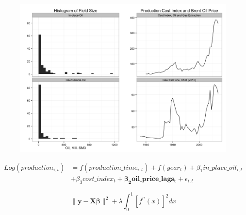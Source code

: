 \documentclass{beamer}
\begin{document}
\begin{frame}
\begin{figure}
	\includegraphics[width=1\textwidth]{figures/data_descriptives.png}
	\label{data_descriptives}
\end{figure}
\end{frame}



\begin{frame}
\begin{equation}
\begin{split}
	Log(production_{i,t}) & = f(production\_time_{i,t}) + f(year_t) + \beta_1 in\_place\_oil_{i,t}\\
	 \quad & + \beta_3 cost\_index_{t} + \mathbf{\beta_2 oil\_price\_lags_t} +  
	  \epsilon_{i,t}
\label{gam_price_eqn}
\end{split}
\end{equation}
\end{frame}


\begin{frame}
\begin{equation}
\| \mathbf{y} - \mathbf{X\beta} \| ^2 + \lambda \int_{0}^{1} [f^{\prime \prime}(x)]^2 dx
\label{min_equation}
\end{equation}
\end{frame}
\end{document}
